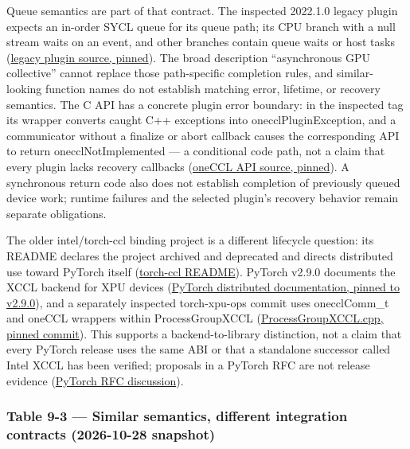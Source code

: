 Queue semantics are part of that contract. The inspected 2022.1.0 legacy
plugin expects an in-order SYCL queue for its queue path; its CPU branch
with a null stream waits on an event, and other branches contain queue
waits or host tasks
(\href{https://raw.githubusercontent.com/uxlfoundation/oneCCL/2022.1.0/plugins/legacy/ccl_legacy.cpp}{legacy
plugin source, pinned}). The broad description ``asynchronous GPU
collective'' cannot replace those path-specific completion rules, and
similar-looking function names do not establish matching error,
lifetime, or recovery semantics. The C API has a concrete plugin error
boundary: in the inspected tag its wrapper converts caught C++
exceptions into onecclPluginException, and a communicator without a
finalize or abort callback causes the corresponding API to return
onecclNotImplemented --- a conditional code path, not a claim that every
plugin lacks recovery callbacks
(\href{https://raw.githubusercontent.com/uxlfoundation/oneCCL/2022.1.0/src/api.cpp}{oneCCL
API source, pinned}). A synchronous return code also does not establish
completion of previously queued device work; runtime failures and the
selected plugin's recovery behavior remain separate obligations.

The older intel/torch-ccl binding project is a different lifecycle
question: its README declares the project archived and deprecated and
directs distributed use toward PyTorch itself
(\href{https://raw.githubusercontent.com/intel/torch-ccl/master/README.md}{torch-ccl
README}). PyTorch v2.9.0 documents the XCCL backend for XPU devices
(\href{https://raw.githubusercontent.com/pytorch/pytorch/v2.9.0/docs/source/distributed.md}{PyTorch
distributed documentation, pinned to v2.9.0}), and a separately
inspected torch-xpu-ops commit uses onecclComm\_t and oneCCL wrappers
within ProcessGroupXCCL
(\href{https://raw.githubusercontent.com/intel/torch-xpu-ops/73a6552c3c122614d2651de2a0c6feb8f81ae613/src/xccl/ProcessGroupXCCL.cpp}{ProcessGroupXCCL.cpp,
pinned commit}). This supports a backend-to-library distinction, not a
claim that every PyTorch release uses the same ABI or that a standalone
successor called Intel XCCL has been verified; proposals in a PyTorch
RFC are not release evidence
(\href{https://api.github.com/repos/pytorch/pytorch/issues/194761}{PyTorch
RFC discussion}).

\subsubsection{Table 9-3 --- Similar semantics, different integration
contracts (2026-10-28
snapshot)}\label{table-9-3-similar-semantics-different-integration-contracts-2026-10-28-snapshot}

